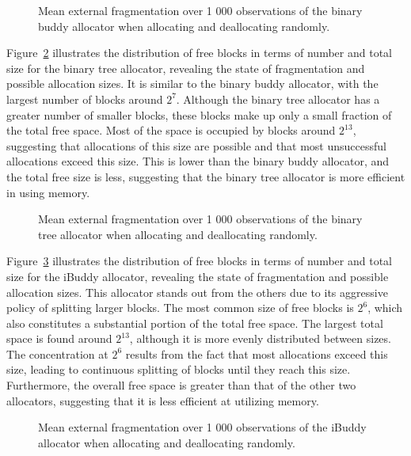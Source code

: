 \begin{figure}[h]
    \centering
    
    \caption{Mean external fragmentation over 1 000 observations of the binary buddy allocator when allocating and deallocating randomly.}
    \label{fig:fragextbinary}
\end{figure}

Figure~\ref{fig:fragextbt} illustrates the distribution of free blocks in terms of number and total size for the binary tree allocator, revealing the state of fragmentation and possible allocation sizes. It is similar to the binary buddy allocator, with the largest number of blocks around $2^7$. Although the binary tree allocator has a greater number of smaller blocks, these blocks make up only a small fraction of the total free space. Most of the space is occupied by blocks around $2^{13}$, suggesting that allocations of this size are possible and that most unsuccessful allocations exceed this size. This is lower than the binary buddy allocator, and the total free size is less, suggesting that the binary tree allocator is more efficient in using memory.

\begin{figure}[h]
    \centering
    
    \caption{Mean external fragmentation over 1 000 observations of the binary tree allocator when allocating and deallocating randomly.}
    \label{fig:fragextbt}
\end{figure}

Figure~\ref{fig:fragextibuddy} illustrates the distribution of free blocks in terms of number and total size for the iBuddy allocator, revealing the state of fragmentation and possible allocation sizes. This allocator stands out from the others due to its aggressive policy of splitting larger blocks. The most common size of free blocks is $2^6$, which also constitutes a substantial portion of the total free space. The largest total space is found around $2^{13}$, although it is more evenly distributed between sizes. The concentration at $2^6$ results from the fact that most allocations exceed this size, leading to continuous splitting of blocks until they reach this size. Furthermore, the overall free space is greater than that of the other two allocators, suggesting that it is less efficient at utilizing memory.

\begin{figure}[h]
    \centering
    
    \caption{Mean external fragmentation over 1 000 observations of the iBuddy allocator when allocating and deallocating randomly.}
    \label{fig:fragextibuddy}
\end{figure}

